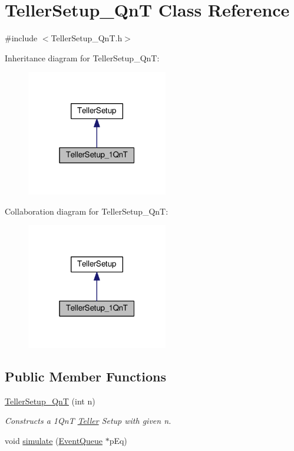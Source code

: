 \hypertarget{class_teller_setup__1_qn_t}{}\section{Teller\+Setup\+\_\+QnT Class Reference}
\label{class_teller_setup__1_qn_t}


{\ttfamily \#include $<$Teller\+Setup\+\_\+Qn\+T.\+h$>$}



Inheritance diagram for Teller\+Setup\+\_\+QnT\+:
\nopagebreak
\begin{figure}[H]
\begin{center}
\leavevmode
\includegraphics[width=175pt]{class_teller_setup__1_qn_t__inherit__graph}
\end{center}
\end{figure}


Collaboration diagram for Teller\+Setup\+\_\+QnT\+:
\nopagebreak
\begin{figure}[H]
\begin{center}
\leavevmode
\includegraphics[width=175pt]{class_teller_setup__1_qn_t__coll__graph}
\end{center}
\end{figure}
\subsection*{Public Member Functions}
\begin{DoxyCompactItemize}
\item 
\hyperlink{class_teller_setup__1_qn_t_a811d35eefb095b4907605596a99a444b}{Teller\+Setup\+\_\+QnT} (int n)
\begin{DoxyCompactList}\small\item\em Constructs a 1\+QnT \hyperlink{class_teller}{Teller} Setup with given n. \end{DoxyCompactList}\item 
void \hyperlink{class_teller_setup__1_qn_t_a99b00d1025e46b359f6d1f05f51ebde1}{simulate} (\hyperlink{class_event_queue}{Event\+Queue} $\ast$p\+Eq)
\end{DoxyCompactItemize}

